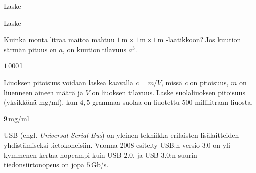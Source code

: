 \begin{tehtavasivu}
\begin{tehtava}
Laske
\begin{vastaus}
\end{vastaus}
\end{tehtava}

\begin{tehtava}
Laske
\begin{vastaus}
\end{vastaus}
\end{tehtava}


\begin{tehtava}
Kuinka monta litraa maitoa mahtuu $1\,\textrm{m}\times 1\,\textrm{m}\times 1\,\textrm{m}$ -laatikkoon? Jos kuution särmän pituus on $a$, on kuution tilavuus $a^3$.
	\begin{vastaus}
	$1\,000$\,l
	\end{vastaus}
\end{tehtava}

\begin{tehtava}
Liuoksen pitoisuus voidaan laskea kaavalla $c=m/V$, missä $c$ on pitoisuus, $m$ on liuenneen aineen määrä ja $V$ on liuoksen tilavuus. Laske suolaliuoksen pitoisuus (yksikkönä mg/ml), kun $4,5$ grammaa suolaa on liuotettu $500$ millilitraan liuosta. %
\begin{vastaus}
$9$\,mg/ml
\end{vastaus}
\end{tehtava}

\begin{tehtava}
USB (engl. \textit{Universal Serial Bus}) on yleinen tekniikka erilaisten lisälaitteiden yhdistämiseksi tietokoneisiin. Vuonna 2008 esitelty USB:n versio $3.0$ on yli kymmenen kertaa nopeampi kuin USB $2.0$, ja USB $3.0$:n suurin tiedonsiirtonopeus on jopa $5$\,Gb/s.
	\begin{vastaus}
	\end{vastaus}
\end{tehtava}


\end{tehtavasivu}
